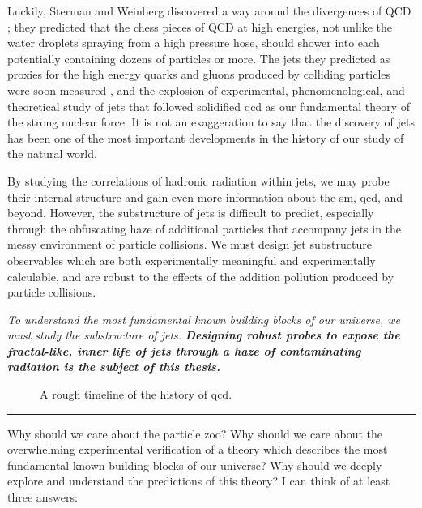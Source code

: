 Luckily, Sterman and Weinberg discovered a way around the divergences of QCD \cite{Sterman:1977wj};
%
they predicted that the chess pieces of QCD at high energies, not unlike the water droplets spraying from a high pressure hose, should shower into  each potentially containing dozens of particles or more.
%
The jets they predicted as proxies for the high energy quarks and gluons produced by colliding particles were soon measured \cite{}, and the explosion of experimental, phenomenological, and theoretical study of jets that followed solidified \gls{qcd} as our fundamental theory of the strong nuclear force.
%
It is not an exaggeration to say that the discovery of jets has been one of the most important developments in the history of our study of the natural world.

By studying the correlations of hadronic radiation within jets, we may probe their internal structure and gain even more information about the \gls{sm}, \gls{qcd}, and beyond.
%
However, the substructure of jets is difficult to predict, especially through the obfuscating haze of additional particles that accompany jets in the messy environment of particle collisions.
%
We must design jet substructure observables which are both experimentally meaningful and experimentally calculable, and are robust to the effects of the addition pollution produced by particle collisions.

\textit{To understand the most fundamental known building blocks of our universe, we must study the substructure of jets.}
%
\textbf{\textit{Designing robust probes to expose the fractal-like, inner life of jets through a haze of contaminating radiation is the subject of this thesis.}}



\begin{figure}[]
    {
        \hspace{-1.7cm}
        
    }
    \caption{
        A rough timeline of the history of \gls{qcd}.
    }
    \label{fig:qcd-timeline}
\end{figure}


\vspace{1.0cm}
\hrule
\vspace{1.0cm}


Why should we care about the particle zoo?
%
Why should we care about the overwhelming experimental verification of a theory which describes the most fundamental known building blocks of our universe?
%
Why should we deeply explore and understand the predictions of this theory?
%
I can think of at least three answers:

